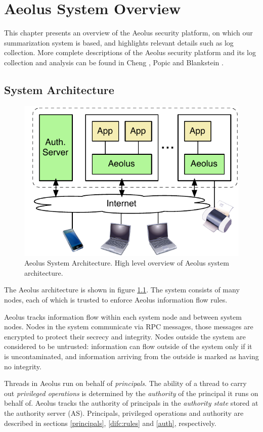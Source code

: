 \chapter{Aeolus System Overview}
\label{aeolus}

This chapter presents an overview of the Aeolus security platform, on which our summarization system is based, and highlights relevant details such as log collection. More complete descriptions of the Aeolus security platform and its log collection and analysis can be found in Cheng \cite{cheng}, Popic \cite{popic} and Blankstein \cite{blanks}.

\section{System Architecture}

\begin{figure}[ht]
\centering
\includegraphics[bb= 0 0 292 204, width=.5\textwidth]{figures/sysarch}
\caption[Aeolus System Architecture]{Aeolus System Architecture. High level overview of Aeolus system architecture.}
\label{fig:aeolus-sysarch}
\end{figure}

The Aeolus architecture is shown in figure \ref{fig:aeolus-sysarch}. The system consists of many nodes, each of which is trusted to enforce Aeolus information flow rules.

Aeolus tracks information flow within each system node and between system nodes. Nodes in the system communicate via RPC messages, those messages are encrypted to protect their secrecy and integrity. Nodes outside the system are considered to be untrusted: information can flow outside of the system only if it is uncontaminated, and information arriving from the outside is marked as having no integrity.


Threads in Aeolus run on behalf of \emph{principals}. The ability of a thread to carry out \emph{privileged operations} is determined by the \emph{authority} of the principal it runs on behalf of. Aeolus tracks the authority of principals in the \emph{authority state} stored at the authority server (AS). Principals, privileged operations and authority are described in sections \ref{principals}, \ref{difc:rules} and \ref{auth}, respectively.

